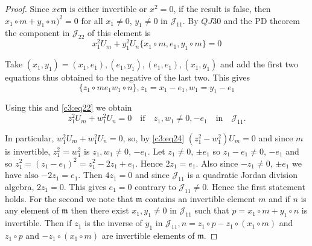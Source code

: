 \begin{proof}
Since $x\epsilon \mathfrak{m}$ is either invertible or $x^{2}=0$, if
the result is false, then $x_1\circ m+y_1\circ n)^{2}=0$ for all
$x_1\neq 0$, $y_1\neq 0$ in $\mathscr{J}_{11}$. By $QJ 30$ and the PD
theorem the component in $\mathscr{J}_{22}$ of this element is 
\begin{equation*}
  x^{2}_1U_m+y^{2}_1U_n\{x_1\circ m, e_1, y_1\circ m\}=0\tag{22}\label{c3:eq22}
\end{equation*}

Take $(x_1,y_1)= (x_1,e_1),(e_1,y_1),(e_1,e_1),(x_1,y_1)$ and add the
first two equations thus obtained to the negative of the last
two. This gives
\begin{equation*}
  \{z_1\circ me_1w_1\circ n\},z_1=x_1-e_1,w_1=y_1-e_1\tag{23}\label{c3:eq23}
\end{equation*}\pageoriginale

Using this and \eqref{c3:eq22} we obtain
\begin{equation*}
  z^{2}_1U_m+w^{2}_1U_n=0\quad{\text{if}}\quad z_1,w_1\neq 0,
  -e_1\quad\text{in}\quad \mathscr{J}_{11}.\tag{24}\label{c3:eq24}
\end{equation*}

In particular, $w^{2}_1U_m+w^{2}_1U_n=0$, so, by \eqref{c3:eq24}
$(z^{2}_1-w^{2}_1)U_m=0$ and since $m$ is invertible,
$z^{2}_1=w^{2}_1$ is $z_1,w_1\neq 0$, $-e_1$. Let $z_1\neq 0$, $\pm
e_1$ so $z_1-e_1\neq 0$, $-e_1$ and so
$z^{2}_1=(z_1-e_1)^{2}=z^{2}_1-2z_1+e_1$. Hence $2z_1=e_1$. Also since
$-z_1\neq 0$, $\pm e_1$ we have also $-2z_1=e_1$. Then $4z_1=0$ and
since $\mathscr{J}_{11}$ is a quadratic Jordan division algebra,
$2z_1=0$. This gives $e_1=0$ contrary to $\mathscr{J}_{11}\neq
0$. Hence the first statement holds. For the second we note that
$\mathfrak{m}$ contains an invertible element $m$ and if $n$ is any
element of $\mathfrak{m}$ then there exist $x_1,y_1\neq 0$ in
$\mathscr{J}_{11}$ such that $p=x_1\circ m+y_1\circ n$ is
invertible. Then if $z_1$ is the inverse of $y_1$ in
$\mathscr{J}_{11},n=z_1\circ p-z_1\circ (x_1\circ m)$ and $z_1\circ p$
and $-z_1\circ (x_1\circ m)$ are invertible elements of
$\mathfrak{m}$. 


\end{proof}
